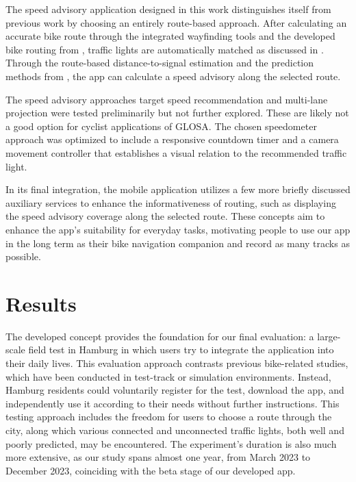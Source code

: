 \begin{Summary}
The speed advisory application designed in this work distinguishes itself from previous work by choosing an entirely route-based approach. After calculating an accurate bike route through the integrated wayfinding tools and the developed bike routing from , traffic lights are automatically matched as discussed in . Through the route-based distance-to-signal estimation and the prediction methods from , the app can calculate a speed advisory along the selected route. 

The speed advisory approaches target speed recommendation and multi-lane projection were tested preliminarily but not further explored. These are likely not a good option for cyclist applications of GLOSA. The chosen speedometer approach was optimized to include a responsive countdown timer and a camera movement controller that establishes a visual relation to the recommended traffic light. 

In its final integration, the mobile application utilizes a few more briefly discussed auxiliary services to enhance the informativeness of routing, such as displaying the speed advisory coverage along the selected route. These concepts aim to enhance the app's suitability for everyday tasks, motivating people to use our app in the long term as their bike navigation companion and record as many tracks as possible.
\end{Summary}

\section{Results}

The developed concept provides the foundation for our final evaluation: a large-scale field test in Hamburg in which users try to integrate the application into their daily lives. This evaluation approach contrasts previous bike-related studies, which have been conducted in test-track or simulation environments. Instead, Hamburg residents could voluntarily register for the test, download the app, and independently use it according to their needs without further instructions. This testing approach includes the freedom for users to choose a route through the city, along which various connected and unconnected traffic lights, both well and poorly predicted, may be encountered. The experiment's duration is also much more extensive, as our study spans almost one year, from March 2023 to December 2023, coinciding with the beta stage of our developed app.

